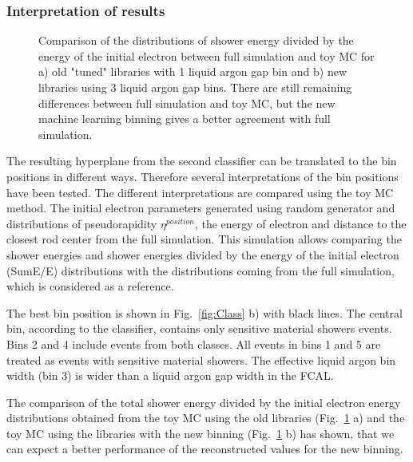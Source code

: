 \subsubsection{Interpretation of results}

\begin{figure}[!tb]
\begin{minipage}[h]{0.49\linewidth}
\end{minipage}
\hfill
\begin{minipage}[h]{0.49\linewidth}
\end{minipage}
\caption{Comparison of the distributions of shower energy divided by  the energy of the initial electron between full simulation and toy MC for a) old "tuned" libraries with 1 liquid argon gap bin and b) new libraries using 3 liquid argon gap bins. There are still remaining differences between full simulation and toy MC, but the new machine learning binning gives a better agreement with full simulation.}
\label{fig:Interpret}
\end{figure}

The resulting hyperplane from the second classifier can be translated to the bin positions in different ways. Therefore several interpretations of the bin positions have been tested. The different interpretations are compared using the toy MC method. The initial electron parameters generated using random generator and distributions of pseudorapidity $\eta^{position}$, the energy of electron and distance to the closest rod center from the full simulation. This simulation allows comparing the shower energies and shower energies divided by  the energy of the initial electron (SumE/E) distributions with the distributions coming from the full simulation, which is considered as a reference.

The best bin position is shown in Fig.~\ref{fig:Class} b) with black lines. The central bin, according to the classifier, contains only sensitive material showers events. Bins 2 and 4 include events from both classes. All events in bins 1 and 5 are treated as events with sensitive material showers. The effective liquid argon bin width (bin 3) is wider than a liquid argon gap width in the FCAL.

The comparison of the total shower energy divided by the initial electron energy distributions  obtained from the toy MC using the old libraries (Fig.~\ref{fig:Interpret} a) and the toy MC using the libraries with the new binning (Fig.~\ref{fig:Interpret} b) has shown,  that we can expect a better performance of  the reconstructed values for the new binning.


